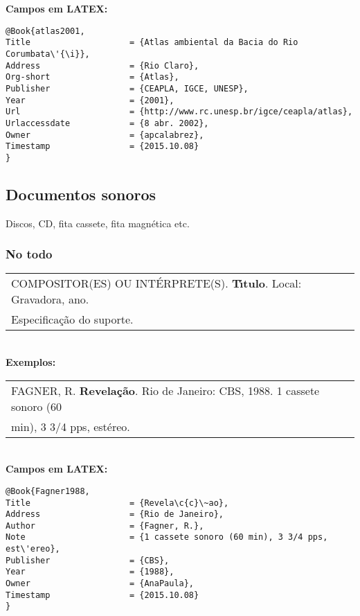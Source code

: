 \textbf{Campos em LATEX:} 

\begin{verbatim}
@Book{atlas2001,
Title                    = {Atlas ambiental da Bacia do Rio Corumbata\'{\i}},
Address                  = {Rio Claro},
Org-short                = {Atlas},
Publisher                = {CEAPLA, IGCE, UNESP},
Year                     = {2001},
Url                      = {http://www.rc.unesp.br/igce/ceapla/atlas},
Urlaccessdate            = {8 abr. 2002},
Owner                    = {apcalabrez},
Timestamp                = {2015.10.08}
}
\end{verbatim}

\subsection{Documentos sonoros}

Discos, CD, fita cassete, fita magn\'etica etc. \\
\subsubsection{No todo}

\begin{tabular}{|l|c|} \hline
	COMPOSITOR(ES) OU INT\'ERPRETE(S). \textbf{T\'{\i}tulo}. Local: Gravadora, ano. \\
	Especifica\c{c}\~ao do suporte. 
	\\\hline
\end{tabular} \\

\textbf{Exemplos:} \\

\begin{tabular}{|l|c|} \hline
	FAGNER, R. \textbf{Revela\c{c}\~ao}. Rio de Janeiro: CBS, 1988. 1 cassete sonoro (60 \\
	min), 3 3/4 pps, est\'ereo.  
	\\\hline
\end{tabular} \\

\textbf{Campos em LATEX:} 

\begin{verbatim}
@Book{Fagner1988,
Title                    = {Revela\c{c}\~ao},
Address                  = {Rio de Janeiro},
Author                   = {Fagner, R.},
Note                     = {1 cassete sonoro (60 min), 3 3/4 pps, 
est\'ereo},
Publisher                = {CBS},
Year                     = {1988},
Owner                    = {AnaPaula},
Timestamp                = {2015.10.08}
}
\end{verbatim}


